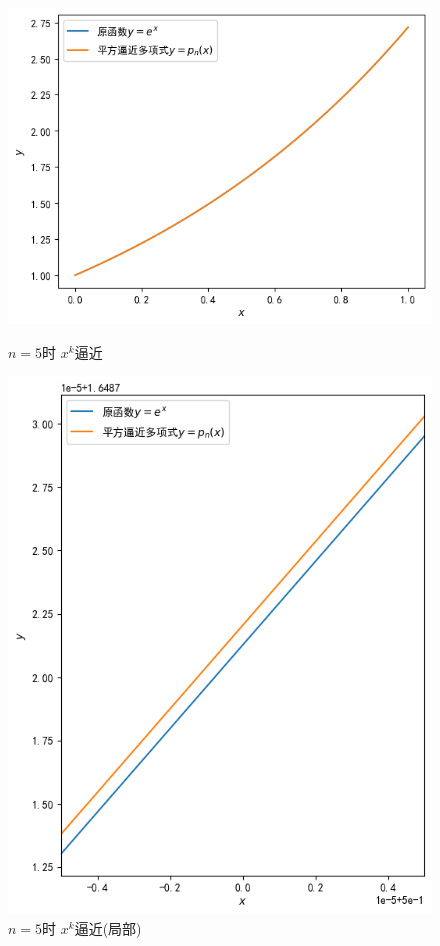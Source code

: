 \documentclass[UTF8,ctexart,a4paper,11pt,openany]{article}
\theoremstyle{definition}
\begin{document}
    \begin{figure}[H]
        \centering
        \begin{minipage}{0.49\linewidth}%
            \centering
            \includegraphics[width=0.9\linewidth]{pics/P5.1.png}
            \caption{$n=5$时 $x^k$逼近}
        \end{minipage}
     \begin{minipage}{0.49\linewidth}
     \centering
     \includegraphics[width=0.9\linewidth]{pics/P5.5.png}
            \caption{$n=5$时 $x^k$逼近(局部)}
        \end{minipage}
    \end{figure}
\end{document}
